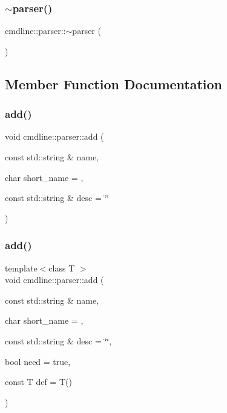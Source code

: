 \subsubsection{\texorpdfstring{$\sim$parser()}{~parser()}}
{\footnotesize\ttfamily cmdline\+::parser\+::$\sim$parser (\begin{DoxyParamCaption}{ }\end{DoxyParamCaption})\hspace{0.3cm}{\ttfamily [inline]}}



\subsection{Member Function Documentation}
\mbox{\label{classcmdline_1_1parser_a122aab1fb389f16170397971be1e75b6}} 
\subsubsection{\texorpdfstring{add()}{add()}\hspace{0.1cm}{\footnotesize\ttfamily [1/3]}}
{\footnotesize\ttfamily void cmdline\+::parser\+::add (\begin{DoxyParamCaption}\item[{const std\+::string \&}]{name,  }\item[{char}]{short\+\_\+name = {},  }\item[{const std\+::string \&}]{desc = {\ttfamily \char`\"{}\char`\"{}} }\end{DoxyParamCaption})\hspace{0.3cm}{\ttfamily [inline]}}

\mbox{\label{classcmdline_1_1parser_af97ab18f409599df07146da819c96bae}} 
\subsubsection{\texorpdfstring{add()}{add()}\hspace{0.1cm}{\footnotesize\ttfamily [2/3]}}
{\footnotesize\ttfamily template$<$class T $>$ \\
void cmdline\+::parser\+::add (\begin{DoxyParamCaption}\item[{const std\+::string \&}]{name,  }\item[{char}]{short\+\_\+name = {},  }\item[{const std\+::string \&}]{desc = {\ttfamily \char`\"{}\char`\"{}},  }\item[{bool}]{need = {\ttfamily true},  }\item[{const T}]{def = {\ttfamily T()} }\end{DoxyParamCaption})\hspace{0.3cm}{\ttfamily [inline]}}


